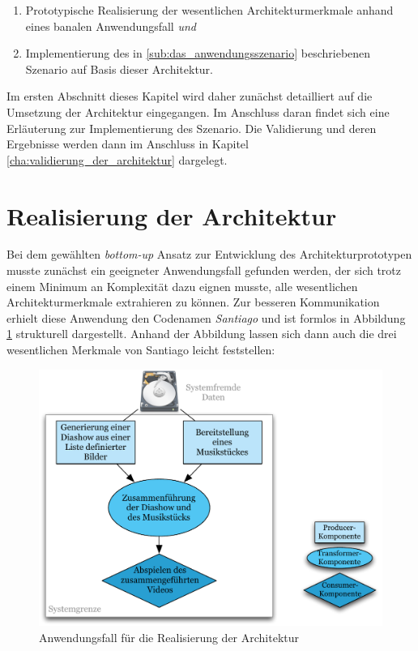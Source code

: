   \begin{enumerate}
    \item Prototypische Realisierung der wesentlichen Architekturmerkmale anhand eines banalen Anwendungsfall \emph{und}
    \item Implementierung des in \ref{sub:das_anwendungsszenario} beschriebenen Szenario auf Basis dieser Architektur.
  \end{enumerate}
  
  Im ersten Abschnitt dieses Kapitel wird daher zunächst detailliert auf die Umsetzung der Architektur eingegangen. Im Anschluss daran findet sich eine Erläuterung zur Implementierung des Szenario. Die Validierung und deren Ergebnisse werden dann im Anschluss in Kapitel \ref{cha:validierung_der_architektur} dargelegt.

\section{Realisierung der Architektur} %
\label{sec:realisierung_der_architektur}

  Bei dem gewählten \emph{bottom-up} Ansatz zur Entwicklung des Architekturprototypen musste zunächst ein geeigneter Anwendungsfall gefunden werden, der sich trotz einem Minimum an Komplexität dazu eignen musste, alle wesentlichen Architekturmerkmale extrahieren zu können. Zur besseren Kommunikation erhielt diese Anwendung den Codenamen \emph{Santiago} und ist formlos in Abbildung \ref{fig:images_Santiago_Anwendungsfall} strukturell dargestellt. Anhand der Abbildung lassen sich dann auch die drei wesentlichen Merkmale von Santiago leicht feststellen:

  \begin{figure}[!hb]
    \centering
      \includegraphics[width=.7\textwidth]{images/Santiago_Anwendungsfall.pdf}
    \caption{Anwendungsfall für die Realisierung der Architektur}
    \label{fig:images_Santiago_Anwendungsfall}
  \end{figure}
    
